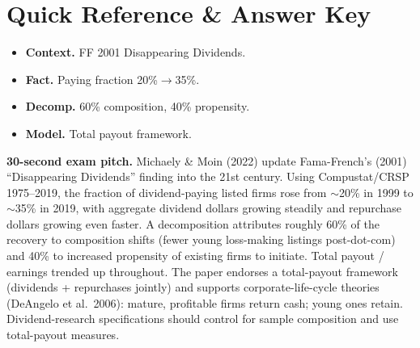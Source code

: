 \documentclass[11pt]{article}
\begin{document}
\section*{Quick Reference \& Answer Key}
\begin{answerbox}
\begin{itemize}
\item \textbf{Context.} FF 2001 Disappearing Dividends.
\item \textbf{Fact.} Paying fraction 20\%$\to$35\%.
\item \textbf{Decomp.} 60\% composition, 40\% propensity.
\item \textbf{Model.} Total payout framework.
\end{itemize}
\end{answerbox}

\begin{keybox}
\textbf{30-second exam pitch.} Michaely \& Moin (2022) update Fama-French's (2001) ``Disappearing Dividends'' finding into the 21st century. Using Compustat/CRSP 1975--2019, the fraction of dividend-paying listed firms rose from $\sim$20\% in 1999 to $\sim$35\% in 2019, with aggregate dividend dollars growing steadily and repurchase dollars growing even faster. A decomposition attributes roughly 60\% of the recovery to composition shifts (fewer young loss-making listings post-dot-com) and 40\% to increased propensity of existing firms to initiate. Total payout / earnings trended up throughout. The paper endorses a total-payout framework (dividends + repurchases jointly) and supports corporate-life-cycle theories (DeAngelo et al.\ 2006): mature, profitable firms return cash; young ones retain. Dividend-research specifications should control for sample composition and use total-payout measures.
\end{keybox}
\end{document}

